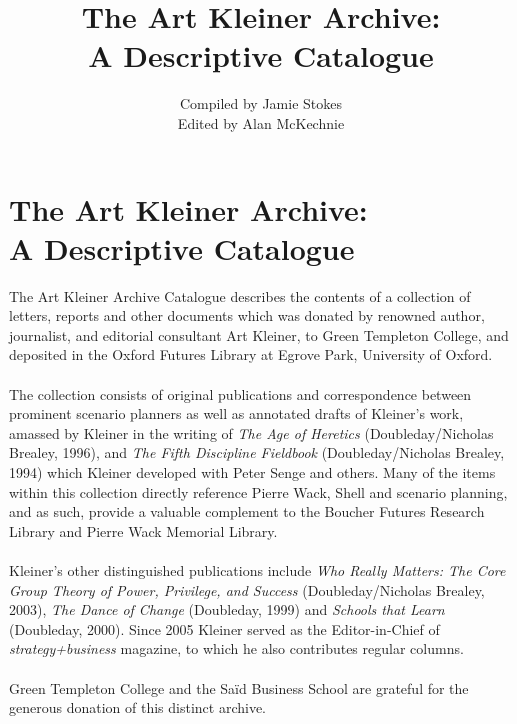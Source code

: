 \documentclass[a4paper,10pt]{article}
\title{The Art Kleiner Archive:\\A Descriptive Catalogue}
\author{Compiled by Jamie Stokes\\Edited by Alan McKechnie}
\begin{document}
\maketitle

\newpage
\section*{The Art Kleiner Archive:\\A Descriptive Catalogue}
The Art Kleiner Archive Catalogue describes the contents of a collection of letters, reports and other documents which was donated by renowned author, journalist, and editorial consultant Art Kleiner, to Green Templeton College, and deposited in the Oxford Futures Library at Egrove Park, University of Oxford.\\
\\
The collection consists of original publications and correspondence between prominent scenario planners as well as annotated drafts of Kleiner’s work, amassed by Kleiner in the writing of \textit{The Age of Heretics} (Doubleday/Nicholas Brealey, 1996), and \textit{The Fifth Discipline Fieldbook} (Doubleday/Nicholas Brealey, 1994) which Kleiner developed with Peter Senge and others. Many of the items within this collection directly reference Pierre Wack, Shell and scenario planning, and as such, provide a valuable complement to the Boucher Futures Research Library and Pierre Wack Memorial Library.\\
\\
Kleiner’s other distinguished publications include \textit{Who Really Matters: The Core Group Theory of Power, Privilege, and Success} (Doubleday/Nicholas Brealey, 2003), \textit{The Dance of Change} (Doubleday, 1999) and \textit{Schools that Learn} (Doubleday, 2000). Since 2005 Kleiner served as the Editor-in-Chief of \textit{strategy+business} magazine, to which he also contributes regular columns.\\
\\
Green Templeton College and the Saïd Business School are grateful for the generous donation of this distinct archive.
 
\nocite{*}

\newpage

\tableofcontents


\newpage

\medskip
{}
\printbibliography[keyword={box1},title={Box 1:1 - 1:5}]
\newpage

\printbibliography[keyword={box2},title={Box 2:1 - 2:5}]
\newpage
\end{document}

